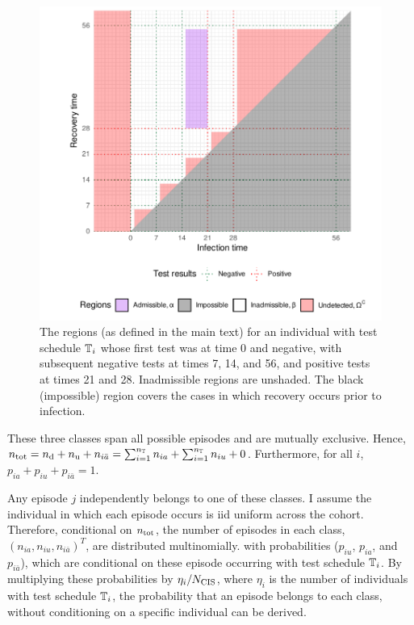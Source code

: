 \documentclass[thesis.tex]{subfiles}
\begin{document}
\begin{figure}
\includegraphics[width=\textwidth]{cis-perfect-testing/regions_diag}
\caption[Admissible, inadmissible, and undetected infections]{The regions (as defined in the main text) for an individual with test schedule $\mathbb{T}_i$ whose first test was at time 0 and negative, with subsequent
negative tests at times 7, 14, and 56, and positive tests at times 21
and 28. Inadmissible regions are unshaded. The black (impossible) region covers the cases in which recovery occurs prior to infection. \label{perf-test:fig:partitionSpace}}
\end{figure}

These three classes span all possible episodes and are mutually exclusive.
Hence, $n_\text{tot} = n_\text{d} + n_\text{u} + n_{i\bar{a}} = \sum_{i=1}^{n_{\mathbb{T}}} n_{ia} + \sum_{i=1}^{n_{\mathbb{T}}} n_{iu} + 0$.
Furthermore, for all $i$, $p_{ia} + p_{iu} + p_{i\bar{a}} = 1$.

Any episode $j$ independently belongs to one of these classes.
I assume the individual in which each episode occurs is iid uniform across the cohort.
Therefore, conditional on $n_\text{tot}$, the number of episodes in each class, $(n_{ia}, n_{iu}, n_{i\bar{a}})^T$, are distributed multinomially.
with probabilities ($p_{iu}$, $p_{ia}$, and $p_{i\bar{a}}$), which are conditional on these episode occurring with test schedule $\mathbb{T}_i$.
By multiplying these probabilities by $\eta_i/N_\text{CIS}$, where $\eta_i$ is the number of individuals with test schedule $\mathbb{T}_i$, the probability that an episode belongs to each class, without conditioning on a specific individual can be derived.
\end{document}
